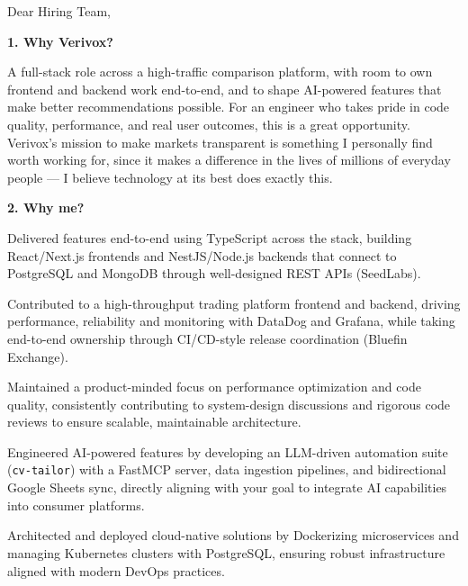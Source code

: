 \documentclass[11pt,a4paper]{coverletter}
\begin{document}

\opening{Dear Hiring Team,}

\vspace{8pt}\noindent\textbf{1. Why Verivox?}\par\vspace{3pt}

A full-stack role across a high-traffic comparison platform, with room to own frontend and backend work end-to-end, and to shape AI-powered features that make better recommendations possible. For an engineer who takes pride in code quality, performance, and real user outcomes, this is a great opportunity. Verivox's mission to make markets transparent is something I personally find worth working for, since it makes a difference in the lives of millions of everyday people — I believe technology at its best does exactly this.

\vspace{8pt}\noindent\textbf{2. Why me?}\par\vspace{3pt}

\bullets

  \item Delivered features end-to-end using TypeScript across the stack, building React/Next.js frontends and NestJS/Node.js backends that connect to PostgreSQL and MongoDB through well-designed REST APIs (SeedLabs).

  \item Contributed to a high-throughput trading platform frontend and backend, driving performance, reliability and monitoring with DataDog and Grafana, while taking end-to-end ownership through CI/CD-style release coordination (Bluefin Exchange).

  \item Maintained a product-minded focus on performance optimization and code quality, consistently contributing to system-design discussions and rigorous code reviews to ensure scalable, maintainable architecture.

  \item Engineered AI-powered features by developing an LLM-driven automation suite (\texttt{cv-tailor}) with a FastMCP server, data ingestion pipelines, and bidirectional Google Sheets sync, directly aligning with your goal to integrate AI capabilities into consumer platforms.

  \item Architected and deployed cloud-native solutions by Dockerizing microservices and managing Kubernetes clusters with PostgreSQL, ensuring robust infrastructure aligned with modern DevOps practices.
\end{document}
